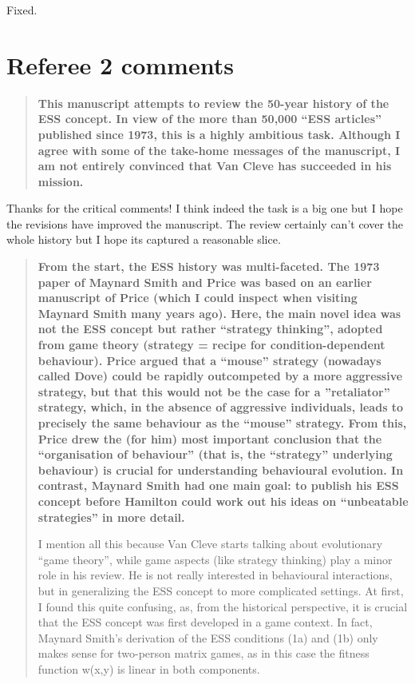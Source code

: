\documentclass[10pt,parskip=full,foldmarks=off,addrfield=off,backaddress=false,refline=dateleft,letterpaper]{scrlttr2}
\newenvironment{reviewerquote}{\begin{quote}\color{DarkBlue}\bfseries}{\end{quote}}
\begin{document}
\begin{letter}
Fixed.

\section{Referee 2 comments}

\begin{reviewerquote}
This manuscript attempts to review the 50-year history of the ESS concept. In view of the more than 50,000 “ESS articles” published since 1973, this is a highly ambitious task. Although I agree with some of the take-home messages of the manuscript, I am not entirely convinced that Van Cleve has succeeded in his mission.
\end{reviewerquote}

Thanks for the critical comments! I think indeed the task is a big one but I hope the revisions have improved the manuscript. The review certainly can't cover the whole history but I hope its captured a reasonable slice.

\begin{reviewerquote}
From the start, the ESS history was multi-faceted. The 1973 paper of Maynard Smith and Price was based on an earlier manuscript of Price (which I could inspect when visiting Maynard Smith many years ago). Here, the main novel idea was not the ESS concept but rather “strategy thinking”, adopted from game theory (strategy = recipe for condition-dependent behaviour). Price argued that a “mouse” strategy (nowadays called Dove) could be rapidly outcompeted by a more aggressive strategy, but that this would not be the case for a ”retaliator” strategy, which, in the absence of aggressive individuals, leads to precisely the same behaviour as the “mouse” strategy. From this, Price drew the (for him) most important conclusion that the “organisation of behaviour” (that is, the “strategy” underlying behaviour) is crucial for understanding behavioural evolution. In contrast, Maynard Smith had one main goal: to publish his ESS concept before Hamilton could work out his ideas on “unbeatable strategies” in more detail.

I mention all this because Van Cleve starts talking about evolutionary “game theory”, while game aspects (like strategy thinking) play a minor role in his review. He is not really interested in behavioural interactions, but in generalizing the ESS concept to more complicated settings. At first, I found this quite confusing, as, from the historical perspective, it is crucial that the ESS concept was first developed in a game context. In fact, Maynard Smith’s derivation of the ESS conditions (1a) and (1b) only makes sense for two-person matrix games, as in this case the fitness function w(x,y) is linear in both components.
\end{reviewerquote}


\end{letter}
\end{document}
